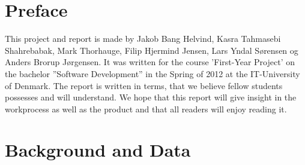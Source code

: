 \documentclass[a4paper,10pt,titlepage]{article}
\begin{document}
	\tableofcontents
	
	\newpage
	\section{Preface}
		This project and report is made by Jakob Bang Helvind, Kasra Tahmasebi Shahrebabak, Mark Thorhauge, Filip Hjermind Jensen, Lars Yndal S\o rensen og
		Anders Brorup J\o rgensen. It was written for the course ’First-Year Project’ on the bachelor ”Software Development” in the Spring of 2012 at the
		IT-University of Denmark. The report is written in terms, that we believe fellow students possesses and will understand. We hope that this 
		report will give insight in the workprocess as well as the product and that all readers will enjoy reading it.
		
	\newpage
	\section{Background and Data}
	
\end{document}
